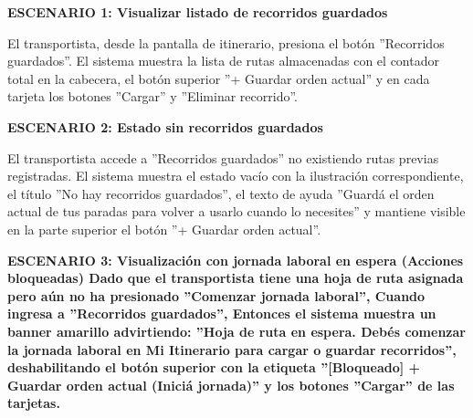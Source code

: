 \documentclass[a4paper,9pt]{article}
\begin{document}
\begin{tcolorbox}[hucard, title={\textbf{HU-63: MOSTRAR RECORRIDOS GUARDADOS} \hfill \scriptsize \colorbox{tealstatus}{\textbf{\ Accepted\ }} \quad \colorbox{white}{\textcolor{primarydark}{\textbf{\ 3 pts\ }}}}]
{\footnotesize
\noindent\textbf{\textcolor{secondarydark}{ESCENARIO 1:  Visualizar listado de recorridos guardados}}\par\vspace{1pt}
El transportista, desde la pantalla de itinerario, presiona el botón ''Recorridos guardados''. El sistema muestra la lista de rutas almacenadas con el contador total en la cabecera, el botón superior ''+ Guardar orden actual'' y en cada tarjeta los botones ''Cargar'' y ''Eliminar recorrido''.\par\vspace{2.5pt}
\noindent\textbf{\textcolor{secondarydark}{ESCENARIO 2:  Estado sin recorridos guardados}}\par\vspace{1pt}
El transportista accede a ''Recorridos guardados'' no existiendo rutas previas registradas. El sistema muestra el estado vacío con la ilustración correspondiente, el título ''No hay recorridos guardados'', el texto de ayuda ''Guardá el orden actual de tus paradas para volver a usarlo cuando lo necesites'' y mantiene visible en la parte superior el botón ''+ Guardar orden actual''.\par\vspace{2.5pt}
\noindent\textbf{\textcolor{secondarydark}{ESCENARIO 3:  Visualización con jornada laboral en espera (Acciones bloqueadas) Dado que el transportista tiene una hoja de ruta asignada pero aún no ha presionado ''Comenzar jornada laboral'', Cuando ingresa a ''Recorridos guardados'', Entonces el sistema muestra un banner amarillo advirtiendo: ''Hoja de ruta en espera. Debés comenzar la jornada laboral en Mi Itinerario para cargar o guardar recorridos'', deshabilitando el botón superior con la etiqueta ''[Bloqueado] + Guardar orden actual (Iniciá jornada)'' y los botones ''Cargar'' de las tarjetas.}}\par\vspace{1pt}
}\par
\end{tcolorbox}
\end{document}

